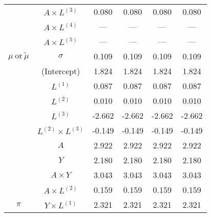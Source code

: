 \begin{sidewaystable}
\begin{minipage}[t]{0.5\textwidth}
\begin{tabular}[t]{>{}ccccc>{}c}
\cmidrule{2-6}
 & $A \times L^{(3)}$ & 0.080 & 0.080 & 0.080 & 0.080\\
\cmidrule{2-6}
 & $A \times L^{(4)}$ & --- & --- & --- & ---\\
\cmidrule{2-6}
 & $A \times L^{(5)}$ & --- & --- & --- & ---\\
\cmidrule{2-6}
\multirow{-15}{*}{\centering\arraybackslash $\mu~\text{or}~\tilde\mu$} & $\sigma$ & 0.109 & 0.109 & 0.109 & 0.109\\
\cmidrule{1-6}
 & (Intercept) & 1.824 & 1.824 & 1.824 & 1.824\\
\cmidrule{2-6}
 & $L^{(1)}$ & 0.087 & 0.087 & 0.087 & 0.087\\
\cmidrule{2-6}
 & $L^{(2)}$ & 0.010 & 0.010 & 0.010 & 0.010\\
\cmidrule{2-6}
 & $L^{(3)}$ & -2.662 & -2.662 & -2.662 & -2.662\\
\cmidrule{2-6}
 & $L^{(2)} \times L^{(3)}$ & -0.149 & -0.149 & -0.149 & -0.149\\
\cmidrule{2-6}
 & $A$ & 2.922 & 2.922 & 2.922 & 2.922\\
\cmidrule{2-6}
 & $Y$ & 2.180 & 2.180 & 2.180 & 2.180\\
\cmidrule{2-6}
 & $A\times Y$ & 3.043 & 3.043 & 3.043 & 3.043\\
\cmidrule{2-6}
 & $A \times L^{(2)}$ & 0.159 & 0.159 & 0.159 & 0.159\\
\cmidrule{2-6}
\multirow{-10}{*}{\centering\arraybackslash $\pi$} & $Y \times L^{(1)}$ & 2.321 & 2.321 & 2.321 & 2.321\\
\hline
\end{tabular}
\end{minipage}
\begin{minipage}[t]{0.5\textwidth}


\end{minipage}
\end{sidewaystable}
